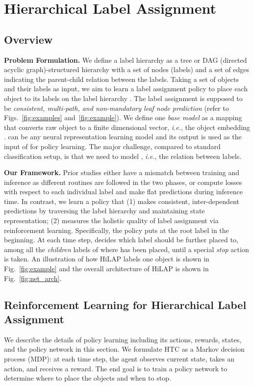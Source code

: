 \documentclass[11pt,a4paper]{article}
\newcommand{\ie}{\textit{i.e.}} \newcommand{\eg}{\textit{e.g.}}
\begin{document}
 
\section{Hierarchical Label Assignment}
\label{subsec_hla}

\subsection{Overview}

\noindent
\textbf{Problem Formulation.}
We define a label hierarchy  as a tree or DAG (directed acyclic graph)-structured hierarchy with a set of nodes (labels)  and a set of edges  indicating the parent-child relation between the labels.
Taking a set of objects  and their labels  as input, we aim to learn a label assignment policy  to place each object  to its labels  on the label hierarchy .
The label assignment is supposed to be \textit{consistent, multi-path, and non-mandatory leaf node prediction} (refer to Figs.~\ref{fig:examples} and~\ref{fig:example}).
We define one \textit{base model}  as a mapping  that converts raw object  to a finite dimensional vector, \ie, the object embedding .
 can be any neural representation learning model and its output  is used as the input of  for policy learning.
The major challenge, compared to standard classification setup, is that we need to model , \ie, the relation between labels.


\smallskip
\noindent
\textbf{Our Framework.}
Prior studies either have a mismatch between training and inference as different routines are followed in the two phases, or compute losses with respect to each individual label and make flat predictions during inference time.
In contrast, we learn a policy that (1) makes consistent, inter-dependent predictions by traversing the label hierarchy and maintaining state representation; (2) measures the holistic quality of label assignment via reinforcement learning.
Specifically, the policy  puts  at the root label in the beginning. At each time step,  decides which label  should be further placed to, among all the \textit{children} labels of where  has been placed, until a special \textit{stop} action is taken.
An illustration of how HiLAP labels one object is shown in Fig.~\ref{fig:example} and the overall architecture of HiLAP is shown in Fig.~\ref{fig:net_arch}.




\subsection{Reinforcement Learning for Hierarchical Label Assignment}
\label{sec_rl4taxo}
We describe the details of policy learning including its actions, rewards, states, and the policy network in this section.
We formulate HTC as a Markov decision process (MDP): at each time step, the agent observes current state, takes an action, and receives a reward.
The end goal is to train a policy network to determine where to place the objects and when to stop.
\end{document}
